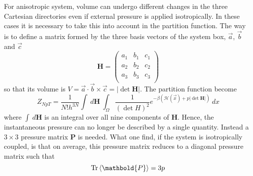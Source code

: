 For anisotropic system, volume can undergo different changes in the three Cartesian directories even if external pressure is applied isotropically. In these cases it is necessary to take this into account in the partition function. The way is to define a matrix formed by the three basis vectors of the system box, $\vec a$, $\vec b$ and $\vec c$
\begin{equation}
	 \mathbold{H} = 
	\begin{pmatrix}
		a_1 & b_1 & c_1 \\
		a_2 & b_2 & c_2 \\
		a_3 & b_3 & c_3 \\
	\end{pmatrix}
	\label{eq:volumeMatrix}
\end{equation}
so that its volume is $V = \vec a\cdot \vec b\times \vec c = |\det{ \mathbold{H}}|$. The partition function become
\begin{equation*}
	Z_{NpT} = \frac{1}{N!h^{3N}}\int\ d \mathbold{H} \ \int_\Omega \frac{1}{(\det{H})^2} e^{-\beta(\mathcal{H}(\vec x) + p|\det{ \mathbold{H}}|)}\ dx
\end{equation*}
where $\int\ d\mathbold{H}$ is an integral over all nine components of $\mathbold{H}$. Hence, the instantaneous pressure can no longer be described by a single quantity. Instead a $3\times 3$ pressure matrix $ \mathbold{P}$ is needed. What one find, if the system is isotropically coupled, is that on average, this pressure matrix reduces to a diagonal pressure matrix such that
\begin{equation*}
	\text{Tr}\ave{ \mathbold{P}} = 3p
\end{equation*}



